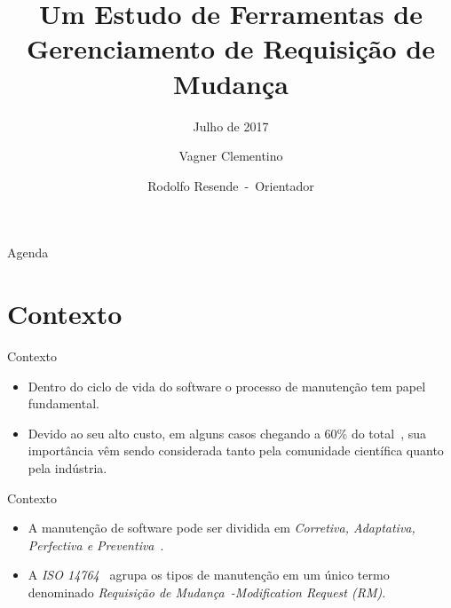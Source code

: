 \documentclass[t,14pt,mathserif]{beamer}
\title[] %
{Um Estudo de Ferramentas de \\
Gerenciamento de Requisição de Mudança}
\subtitle{Julho de 2017}
\author[] %
{Vagner Clementino\\%
	\and Rodolfo Resende~-~Orientador%
	}
\institute[] %
{Departamento de Ciência da Computação\\
 Universidade Federal de Minas Gerais
}
\date[2017/07/13] %
\begin{document}
\begin{frame}
  \titlepage{}
\end{frame}

\begin{frame}{Agenda}
  \tableofcontents[pausesections]
\end{frame}




\section{Contexto}

\begin{frame}{Contexto}
	\begin{itemize}
        \item Dentro do ciclo de vida do software o processo de manutenção tem
            papel fundamental.
        \item Devido ao seu alto custo, em alguns casos chegando a 60\% do
            total~\cite{kaur2015review}, sua importância vêm sendo considerada
            tanto pela comunidade científica quanto pela indústria.
	\end{itemize}
\end{frame}

\begin{frame}{Contexto}
	\begin{itemize}
        \item A manutenção de software pode ser dividida em \textit{Corretiva,
                Adaptativa, Perfectiva e
                Preventiva}~\cite{Lientz:1980:SMM:601062,159342}.
        \item A \textit{ISO 14764}~\cite{1703974} agrupa os tipos de manutenção
            em um único termo denominado \textit{Requisição de
                Mudança~-Modification Request (RM)}.
	\end{itemize}
\end{frame}
\end{document}
